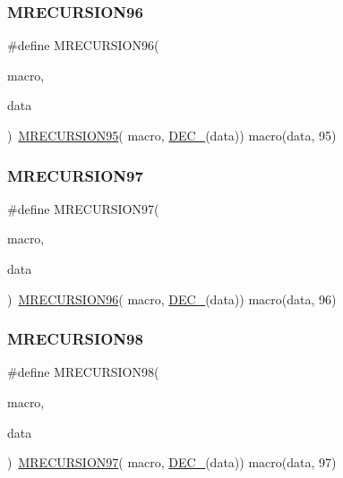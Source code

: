 \subsubsection{\texorpdfstring{MRECURSION96}{MRECURSION96}}
{\footnotesize\ttfamily \#define M\+R\+E\+C\+U\+R\+S\+I\+O\+N96(\begin{DoxyParamCaption}\item[{}]{macro,  }\item[{}]{data }\end{DoxyParamCaption})~\mbox{\hyperlink{group__group__sam0__utils__mrecursion_ga1f84d15b7e60fc215e8ebe7b5b151084}{M\+R\+E\+C\+U\+R\+S\+I\+O\+N95}}(  macro, \mbox{\hyperlink{group__group__sam0__utils__mrecursion_ga1d23d683797679dca8c3512a54a5dcae}{D\+E\+C\+\_\+}}(data))   macro(data, 95)}

\mbox{\label{group__group__sam0__utils__mrecursion_gab9ed28d94481bd01b1c3edcc6fce2dd6}} 
\subsubsection{\texorpdfstring{MRECURSION97}{MRECURSION97}}
{\footnotesize\ttfamily \#define M\+R\+E\+C\+U\+R\+S\+I\+O\+N97(\begin{DoxyParamCaption}\item[{}]{macro,  }\item[{}]{data }\end{DoxyParamCaption})~\mbox{\hyperlink{group__group__sam0__utils__mrecursion_ga3e4d11ac26580cc1a2f0c9df299a0414}{M\+R\+E\+C\+U\+R\+S\+I\+O\+N96}}(  macro, \mbox{\hyperlink{group__group__sam0__utils__mrecursion_ga1d23d683797679dca8c3512a54a5dcae}{D\+E\+C\+\_\+}}(data))   macro(data, 96)}

\mbox{\label{group__group__sam0__utils__mrecursion_ga09220b4e632b8d49bf826fee3f9235c7}} 
\subsubsection{\texorpdfstring{MRECURSION98}{MRECURSION98}}
{\footnotesize\ttfamily \#define M\+R\+E\+C\+U\+R\+S\+I\+O\+N98(\begin{DoxyParamCaption}\item[{}]{macro,  }\item[{}]{data }\end{DoxyParamCaption})~\mbox{\hyperlink{group__group__sam0__utils__mrecursion_gab9ed28d94481bd01b1c3edcc6fce2dd6}{M\+R\+E\+C\+U\+R\+S\+I\+O\+N97}}(  macro, \mbox{\hyperlink{group__group__sam0__utils__mrecursion_ga1d23d683797679dca8c3512a54a5dcae}{D\+E\+C\+\_\+}}(data))   macro(data, 97)}


